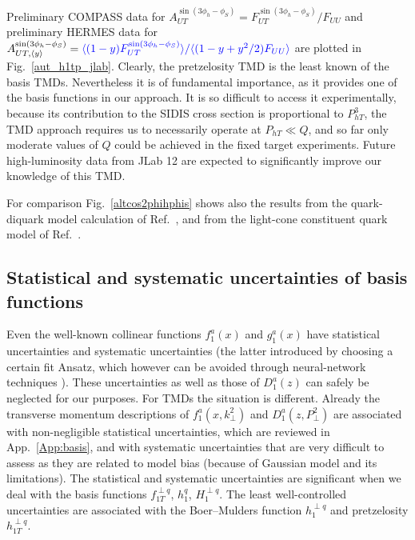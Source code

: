 \documentclass[a4paper,11pt]{article}
\newcommand{\blue}[1]{{\color{blue} #1}}
\newcommand{\la}{\langle}
\newcommand{\ra}{\rangle}
\newcommand{\ps}[1]{\blue{#1}}
\def\Phperp{P_{hT}}
\def\kperp{k_\perp}
\def\pperp{P_\perp}
\begin{document}
Preliminary COMPASS data \cite{Parsamyan:2013fia} for 
$A_{UT}^{\sin(3 \phi_h - \phi_S)}=F_{UT}^{\sin(3 \phi_h - \phi_S)}/F_{UU}$ and 
preliminary HERMES data \cite{Schnell:2010zza} for
$A_{UT, \langle y \rangle}^{\sin(3 \phi_h - \phi_S)}=\ps{\la
(1-y)F_{UT}^{\sin(3 \phi_h - \phi_S)}\ra/\la(1-y + y^2/2)F_{UU}\ra}$
are plotted in Fig.~\ref{aut_h1tp_jlab}. 
Clearly, the pretzelosity TMD is the least known of the basis TMDs.
Nevertheless it is of fundamental importance, as it provides one of the
basis functions in our approach. It is so difficult to access it
experimentally, because its contribution to the SIDIS cross section
is proportional to $\Phperp^3$, the TMD approach requires us to
necessarily operate at $\Phperp\ll Q$, and so far only moderate
values of $Q$ could be achieved in the fixed target experiments.
Future high-luminosity data from JLab 12 are expected
to significantly improve our knowledge of this TMD.

For comparison Fig.~\ref{altcos2phihphis} shows also the results
from the quark-diquark model calculation of Ref.~\cite{Kotzinian:2008fe},
and from the light-cone constituent quark model of Ref.~\cite{Boffi:2009sh}.



\subsection{Statistical and systematic uncertainties of basis functions}

Even the well-known collinear functions $f_1^a(x)$ and $g_1^a(x)$ have
statistical uncertainties and systematic uncertainties (the latter
introduced by choosing a certain fit Ansatz, which however can be
avoided through neural-network techniques \cite{Ball:2014uwa}).
These uncertainties as well as those of $D_1^a(z)$ can safely
be neglected for our purposes.
For TMDs the situation is different. Already the transverse
momentum descriptions of $f_1^a(x,\kperp^{2})$ and $D_1^a(z,\pperp^{2})$
are associated with non-negligible statistical uncertainties,
which are reviewed in App.~\ref{App:basis}, and with systematic
uncertainties that are very difficult to assess as they are
related to model bias (because of Gaussian model and its limitations).
The statistical and systematic uncertainties are significant
when we deal with the basis functions
$f_{1T}^{\perp q}$, $h_{1}^{q}$, $H_{1}^{\perp q}$.
The least well-controlled uncertainties are associated with the
Boer--Mulders function $h_1^{\perp q}$ and pretzelosity $h_{1T}^{\perp q}$.
\end{document}
